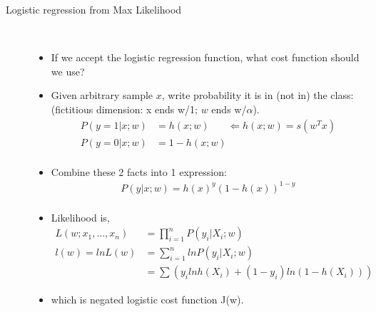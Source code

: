 \documentclass[10pt]{article}
\begin{document}
\begin{description}
	\item[Logistic regression from Max Likelihood]
	\
	\begin{itemize}
		\item If we accept the logistic regression function, what cost function should we use?
		\item Given arbitrary sample $x$, write probability it is in (not in) the class: (fictitious dimension: x ends w/1; $w$ ends w/$\alpha$).
			\begin{align*}
				P(y=1|x;w) &= h(x;w) \ \ \ \ \ \ \ \ \Leftarrow h(x;w) = s(w^{T}x)\\
				P(y=0|x;w) &= 1 - h(x;w)\\
			\end{align*}
		\item Combine these 2 facts into 1 expression:
			\begin{align*}
				P(y|x;w) = h(x)^{y}(1 - h(x))^{1-y}\\
			\end{align*}
		
		\item Likelihood is,
			\begin{align*}
				L(w; x_{1}, \dots, x_{n}) &= \prod_{i=1}^{n} P(y_{i}|X_{i};w)\\
				l(w) = ln L(w) &= \sum_{i=1}^{n} ln P(y_{i}|X_{i};w)\\
				&= \sum (y_{i}ln h(X_{i}) + (1-y_{i})ln(1-h(X_{i})))
			\end{align*}
		\item which is negated logistic cost function J(w).
	\end{itemize}
	

\end{description}
\end{document}
